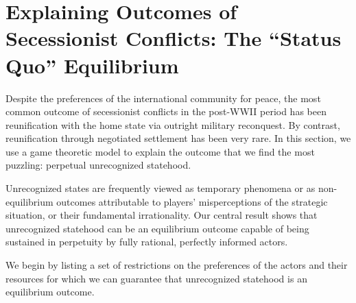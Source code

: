\section{Explaining Outcomes of Secessionist Conflicts: The ``Status Quo'' Equilibrium} 
\label{sec:main}

Despite the preferences of the international community for peace, the most common outcome of secessionist conflicts in the post-WWII period has been reunification with the home state via outright military reconquest. By contrast, reunification through negotiated settlement has been very rare. In this section, we use a game theoretic model to explain the outcome that we find the most puzzling: perpetual unrecognized statehood.

Unrecognized states are frequently viewed as temporary phenomena or as non-equilibrium outcomes attributable to players' misperceptions of the strategic situation, or their fundamental irrationality. Our central result shows that unrecognized statehood can be an equilibrium outcome capable of being sustained in perpetuity by fully rational, perfectly informed actors. 

We begin by listing a set of restrictions on the preferences of the actors and their resources for which we can guarantee that unrecognized statehood is an equilibrium outcome.

